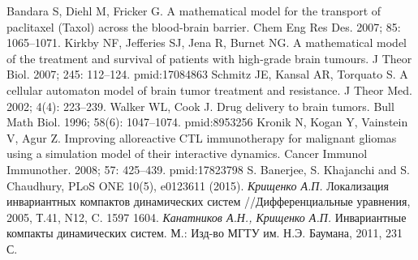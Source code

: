 \documentclass[14pt,a4paper]{extarticle}
\begin{document}
\begin{thebibliography}{6}
		Bandara S, Diehl M, Fricker G. A mathematical model for the transport of paclitaxel (Taxol) across the blood-brain barrier. Chem Eng Res Des. 2007; 85: 1065–1071.
		Kirkby NF, Jefferies SJ, Jena R, Burnet NG. A mathematical model of the treatment and survival of patients with high-grade brain tumours. J Theor Biol. 2007; 245: 112–124. pmid:17084863
		Schmitz JE, Kansal AR, Torquato S. A cellular automaton model of brain tumor treatment and resistance. J Theor Med. 2002; 4(4): 223–239.
		Walker WL, Cook J. Drug delivery to brain tumors. Bull Math Biol. 1996; 58(6): 1047–1074. pmid:8953256
		Kronik N, Kogan Y, Vainstein V, Agur Z. Improving alloreactive CTL immunotherapy for malignant gliomas using a simulation model of their interactive dynamics. Cancer Immunol Immunother. 2008; 57: 425–439. pmid:17823798
		S. Banerjee, S. Khajanchi and S. Chaudhury, PLoS ONE 10(5), e0123611 (2015). 
		\textit{Крищенко А.П.} Локализация инвариантных компактов динамических систем //Дифференциальные уравнения, 2005, Т.41, N12, C. 1597 1604.
		\textit{Канатников А.Н., Крищенко А.П.} Инвариантные компакты динамических систем. М.: Изд-во МГТУ им. Н.Э. Баумана, 2011, 231 С.
	\end{thebibliography}
\end{document}
